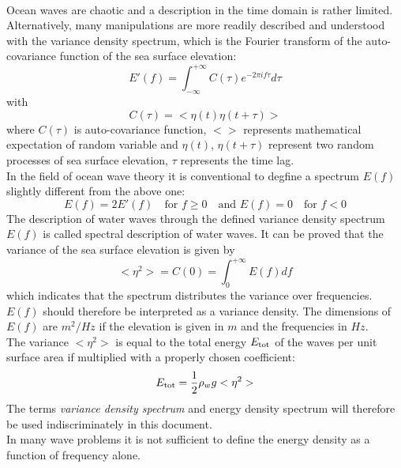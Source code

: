 \documentclass[12pt]{book}
\begin{document}
\\[2ex]
\noindent
Ocean waves are chaotic and a description in the time domain is rather limited. Alternatively,
many manipulations are more readily described and understood with the variance density
spectrum, which is the Fourier transform of the auto-covariance function of the sea surface
elevation:
\begin{equation}
  E'(f) = \int_{-\infty}^{+\infty} C(\tau) e^{-2\pi i f \tau} d\tau
  \label{intro4}
\end{equation}
with
\begin{equation}
  C(\tau) = < \eta(t) \eta(t+\tau) >
  \label{intro5}
\end{equation}
where $C(\tau)$ is auto-covariance function, $<>$ represents mathematical expectation of random
variable and $\eta(t)$, $\eta(t+\tau)$ represent two random processes of sea surface elevation,
$\tau$ represents the time lag.
\\[2ex]
\noindent
In the field of ocean wave theory it is conventional to degfine a spectrum $E(f)$ slightly different
from the above one:
\begin{equation}
  E(f) = 2 E'(f) \quad \mbox{for} \, \, f \geq 0 \quad \mbox{and} \, \, E(f) = 0 \quad \mbox{for} \, \, f < 0
\end{equation}
The description of water waves through the defined variance density spectrum $E(f)$ is called spectral
description of water waves. It can be proved that the variance of the sea surface elevation is given by
\begin{equation}
  <\eta^2> = C(0) = \int_{0}^{+\infty} E(f) df
  \label{intro6}
\end{equation}
which indicates that the spectrum distributes the variance over frequencies. $E(f)$ should therefore
be interpreted as a variance density. The dimensions of $E(f)$ are $m^2/Hz$ if the elevation is given
in $m$ and the frequencies in $Hz$.
\\[2ex]
\noindent
The variance $<\eta^2>$ is equal to the total energy $E_{\rm tot}$ of the waves per unit surface area if
multiplied with a properly chosen coefficient:
\begin{equation}
  E_{\rm tot} = \frac{1}{2} \rho_w g < \eta^2 >
  \label{intro7}
\end{equation}
The terms {\it variance density spectrum} and {energy density spectrum} will therefore be used indiscriminately
in this document.
\\[2ex]
\noindent
In many wave problems it is not sufficient to define the energy density as a function of frequency alone.
\end{document}
